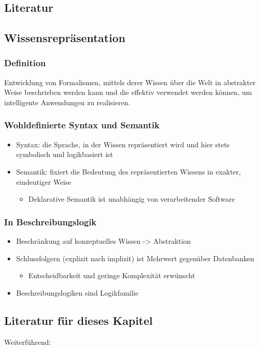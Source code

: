 \subsection{Literatur}



\subsection{Wissensrepräsentation}\label{wissensrepruxe4sentation}

\subsubsection{Definition}\label{definition}

Entwicklung von Formalismen, mittels derer Wissen über die Welt in
abstrakter Weise beschrieben werden kann und die effektiv verwendet
werden können, um intelligente Anwendungen zu realisieren.

\subsubsection{Wohldefinierte Syntax und
Semantik}\label{wohldefinierte-syntax-und-semantik}

\begin{itemize}
\item
  Syntax: die Sprache, in der Wissen repräsentiert wird und hier stets
  symbolisch und logikbasiert ist
\item
  Semantik: fixiert die Bedeutung des repräsentierten Wissens in
  exakter, eindeutiger Weise

  \begin{itemize}
  \item
    Deklarative Semantik ist unabhängig von verarbeitender Software
  \end{itemize}
\end{itemize}

\subsubsection{In Beschreibungslogik}\label{in-beschreibungslogik}

\begin{itemize}
\item
  Beschränkung auf konzeptuelles Wissen -\textgreater{} Abstraktion
\item
  Schlussfolgern (explizit nach implizit) ist Mehrwert gegenüber
  Datenbanken

  \begin{itemize}
  \item
    Entscheidbarkeit und geringe Komplexität erwünscht
  \end{itemize}
\item
  Beschreibungslogiken sind Logikfamilie

\end{itemize}

\subsection*{Literatur für dieses Kapitel}


Weiterführend:


